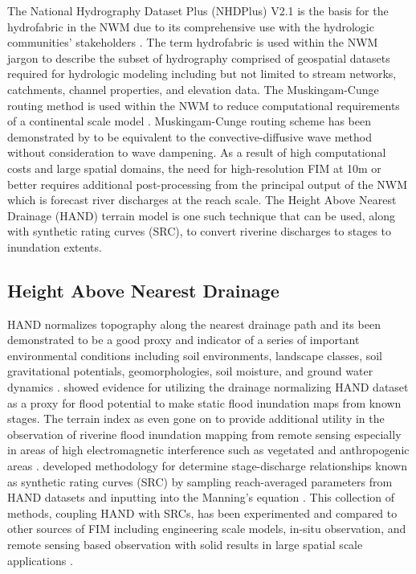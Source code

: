 The National Hydrography Dataset Plus (NHDPlus) V2.1 is the basis for the hydrofabric in the NWM due to its comprehensive use with the hydrologic communities' stakeholders \cite{mckay2012nhdplus}. 
The term hydrofabric is used within the NWM jargon to describe the subset of hydrography comprised of geospatial datasets required for hydrologic modeling including but not limited to stream networks, catchments, channel properties, and elevation data. 
The Muskingam-Cunge routing method is used within the NWM to reduce computational requirements of a continental scale model \cite{bedient2008hydrology,ponce1994variable,gochis2018wrf}.
Muskingam-Cunge routing scheme has been demonstrated by  to be equivalent to the convective-diffusive wave method without consideration to wave dampening.
As a result of high computational costs and large spatial domains, the need for high-resolution FIM at 10m or better requires additional post-processing from the principal output of the NWM which is forecast river discharges at the reach scale. The Height Above Nearest Drainage (HAND) terrain model is one such technique that can be used, along with synthetic rating curves (SRC), to convert riverine discharges to stages to inundation extents.
%
\subsection{Height Above Nearest Drainage}
%
HAND normalizes topography along the nearest drainage path and its been demonstrated to be a good proxy and indicator of a series of important environmental conditions including soil environments, landscape classes, soil gravitational potentials, geomorphologies, soil moisture, and ground water dynamics \cite{renno2008hand,nobre2011height}. 
 showed evidence for utilizing the drainage normalizing HAND dataset as a proxy for flood potential to make static flood inundation maps from known stages.
The terrain index as even gone on to provide additional utility in the observation of riverine flood inundation mapping from remote sensing especially in areas of high electromagnetic interference such as vegetated and anthropogenic areas \cite{aristizabal2020high,shastry2019using,huang2017comparison,twele2016sentinel}.
 developed methodology for determine stage-discharge relationships known as synthetic rating curves (SRC) by sampling reach-averaged parameters from HAND datasets and inputting into the Manning's equation \cite{gauckler1867etudes,manning1890flow}.
This collection of methods, coupling HAND with SRCs, has been experimented and compared to other sources of FIM including engineering scale models, in-situ observation, and remote sensing based observation with solid results in large spatial scale applications \cite{godbout2019error,johnson2019integrated,garousi2019terrain,nobre2016hand,afshari2018comparison,zheng2018geoflood,teng2015rapid,teng2017flood,zhang2018comparative}.
%
